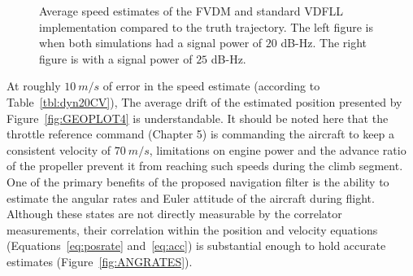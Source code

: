 \begin{figure}[!ht]
\begin{subfigure}{.45\textwidth}
    \end{subfigure}
    \caption{Average speed estimates of the FVDM and standard VDFLL implementation compared to the truth trajectory. The left figure is when both simulations had a signal power of \(20\) dB-Hz. The right figure is with a signal power of \(25\) dB-Hz.}\label{fig:Speed2}
\end{figure}

At roughly \(10~m/s\) of error in the speed estimate (according to Table~\ref{tbl:dyn20CV}), The average drift of the estimated position presented by Figure~\ref{fig:GEOPLOT4} is understandable. It should be noted here that the throttle reference command (Chapter 5) is commanding the aircraft to keep a consistent velocity of \(70~m/s\), limitations on engine power and the advance ratio of the propeller prevent it from reaching such speeds during the climb segment. One of the primary benefits of the proposed navigation filter is the ability to estimate the angular rates and Euler attitude of the aircraft during flight. Although these states are not directly measurable by the correlator measurements, their correlation within the position and velocity equations (Equations~\ref{eq:posrate} and~\ref{eq:acc}) is substantial enough to hold accurate estimates (Figure~\ref{fig:ANGRATES}).


